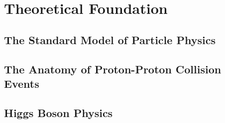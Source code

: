 \chapter{Theoretical Foundation}
\label{chap:theory}

\section{The Standard Model of Particle Physics}
\label{sec:sm}


\section{The Anatomy of Proton-Proton Collision Events}
\label{sec:anatomy}




\section{Higgs Boson Physics}
\label{sec:higgs-phen}


